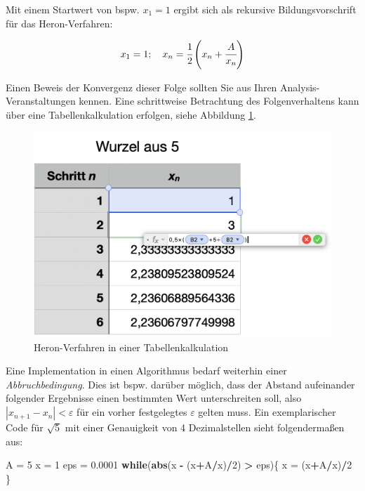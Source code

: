 \documentclass[
]{scrbook}
\newenvironment{Shaded}{\begin{snugshade}}{\end{snugshade}}
\newcommand{\ControlFlowTok}[1]{\textcolor[rgb]{0.13,0.29,0.53}{\textbf{#1}}}
\newcommand{\DecValTok}[1]{\textcolor[rgb]{0.00,0.00,0.81}{#1}}
\newcommand{\FloatTok}[1]{\textcolor[rgb]{0.00,0.00,0.81}{#1}}
\newcommand{\FunctionTok}[1]{\textcolor[rgb]{0.13,0.29,0.53}{\textbf{#1}}}
\newcommand{\NormalTok}[1]{#1}
\newcommand{\OtherTok}[1]{\textcolor[rgb]{0.56,0.35,0.01}{#1}}
\newcommand{\SpecialCharTok}[1]{\textcolor[rgb]{0.81,0.36,0.00}{\textbf{#1}}}
\theoremstyle{definition}
\theoremstyle{definition}
\theoremstyle{definition}
\theoremstyle{definition}
\theoremstyle{remark}
\begin{document}
Mit einem Startwert von bspw. \(x_1 = 1\) ergibt sich als rekursive Bildungsvorschrift für das Heron-Verfahren:

\[x_1 = 1; \quad x_n = \cfrac{1}{2}\left(x_n + \cfrac{A}{x_n}\right)\]

Einen Beweis der Konvergenz dieser Folge sollten Sie aus Ihren Analysis-Veranstaltungen kennen. Eine schrittweise Betrachtung des Folgenverhaltens kann über eine Tabellenkalkulation erfolgen, siehe Abbildung \ref{fig:WurzelTabelle}.

\begin{figure}

{\centering \includegraphics[width=0.5\linewidth]{pictures/9-WurzelTabelle} 

}

\caption{Heron-Verfahren in einer Tabellenkalkulation}\label{fig:WurzelTabelle}
\end{figure}

Eine Implementation in einen Algorithmus bedarf weiterhin einer \emph{Abbruchbedingung}. Dies ist bspw. darüber möglich, dass der Abstand aufeinander folgender Ergebnisse einen bestimmten Wert unterschreiten soll, also \(|x_{n+1}-x_n|<\varepsilon\) für ein vorher festgelegtes \(\varepsilon\) gelten muss. Ein exemplarischer Code für \(\sqrt{5}\) mit einer Genauigkeit von 4 Dezimalstellen sieht folgendermaßen aus:

\begin{Shaded}
\begin{Highlighting}[]
\NormalTok{A }\OtherTok{=} \DecValTok{5}
\NormalTok{x }\OtherTok{=} \DecValTok{1}
\NormalTok{eps }\OtherTok{=} \FloatTok{0.0001}
\ControlFlowTok{while}\NormalTok{(}\FunctionTok{abs}\NormalTok{(x }\SpecialCharTok{{-}}\NormalTok{ (x}\SpecialCharTok{+}\NormalTok{A}\SpecialCharTok{/}\NormalTok{x)}\SpecialCharTok{/}\DecValTok{2}\NormalTok{) }\SpecialCharTok{\textgreater{}}\NormalTok{ eps)\{}
\NormalTok{  x }\OtherTok{=}\NormalTok{ (x}\SpecialCharTok{+}\NormalTok{A}\SpecialCharTok{/}\NormalTok{x)}\SpecialCharTok{/}\DecValTok{2}
\NormalTok{\}}
\end{Highlighting}
\end{Shaded}
\end{document}
